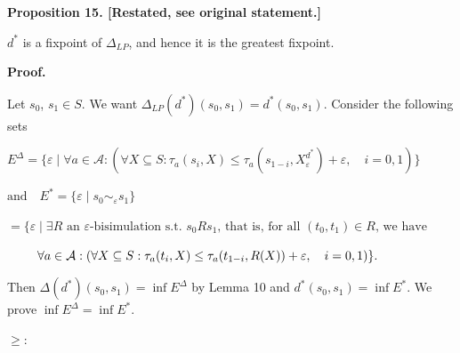 
 
 
\par\medskip\noindent\textbf{Proposition 15. [Restated, see original statement.]}\par
 
 
$d^{*}$ is a fixpoint of $\Delta_{LP}$, and hence it is the greatest fixpoint.\par
 
 
 
 


 
\par\medskip\noindent\textbf{Proof.}\par
 
 
Let $s_{0}$, $s_{1}\in S$. We want $\Delta_{LP}(d^{*})(s_{0},s_{1})=d^{*}(s_{0},s_{1})$. Consider the following sets\par
  
\par  \quad  $\displaystyle E^{\Delta}$\quad  $\displaystyle=\{\varepsilon\mid\forall a\in\mathcal{A}:(\forall X\subseteq S:\tau_{a}(s_{i},X)\leq\tau_{a}(s_{1-i},X^{d^{*}}_{\varepsilon})+\varepsilon,\quad i=0,1)\}$\quad  \quad  
 
\par  \quad  $\displaystyle\mbox{and}\quad E^{*}$\quad  $\displaystyle=\{\varepsilon\mid s_{0}\sim_{\varepsilon}s_{1}\}$\quad  \quad  
 
\par  \quad  \quad  $\displaystyle=\{\varepsilon\mid\exists R\mbox{ an $\varepsilon$-bisimulation s.t. $s_{0}Rs_{1}$, that is, for all $(t_{0},t_{1})\in R$, we have}$\quad  \quad  
 
\par  \quad  \quad  $\displaystyle\mbox{\nobreak\ \nobreak\ \nobreak\ \nobreak\ }\quad\forall a\in\mathcal{A}:(\forall X\subseteq S:\tau_{a}(t_{i},X)\leq\tau_{a}(t_{1-i},R(X))+\varepsilon,\quad i=0,1)\}.$\quad  \quad  
  
Then $\Delta(d^{*})(s_{0},s_{1})=\inf E^{\Delta}$ by Lemma 10 and $d^{*}(s_{0},s_{1})=\inf E^{*}\!$. We prove $\inf E^{\Delta}=\inf E^{*}\!$.\par
  $\geq$:  
 

